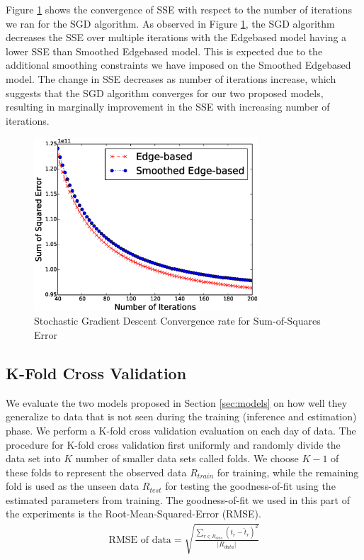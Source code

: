 \documentclass[draft]{sig-alternate}
\begin{document}
Figure \ref{fig:convergence} shows the convergence of SSE with respect to the number of iterations we ran for the SGD algorithm. %
As observed in Figure \ref{fig:convergence}, the SGD algorithm decreases the SSE over multiple iterations with the Edgebased model having a lower SSE than Smoothed Edgebased model. This is expected due to the additional smoothing constraints we have imposed on the Smoothed Edgebased model. The change in SSE decreases as number of iterations increase, which suggests that the SGD algorithm converges for our two proposed models, resulting in marginally improvement in the SSE with increasing number of iterations.
\begin{figure}[htb]
	\centering
	\includegraphics[width=3.3in]{convergence}
	\caption{Stochastic Gradient Descent Convergence rate for Sum-of-Squares Error}
	\label{fig:convergence}
\end{figure}

\subsection{K-Fold Cross Validation}

We evaluate the two models proposed in Section \ref{sec:models} on how well they generalize to data that is not seen during the training (inference and estimation) phase. We perform a K-fold cross validation evaluation on each day of data. The procedure for K-fold cross validation first uniformly and randomly divide the data set into $K$ number of smaller data sets called folds. We choose $K-1$ of these folds to represent the observed data $R_{train}$ for training, while the remaining fold is used as the unseen data $R_{test}$ for testing the goodness-of-fit using the estimated parameters from training. The goodness-of-fit we used in this part of the experiments is the Root-Mean-Squared-Error (RMSE).
\begin{align*}
	\text{RMSE of data} = \sqrt{\frac{\sum_{r \in R_{data}} (t_r - \hat{t}_r)^2}{|R_{data}|}}
\end{align*}
\end{document}
